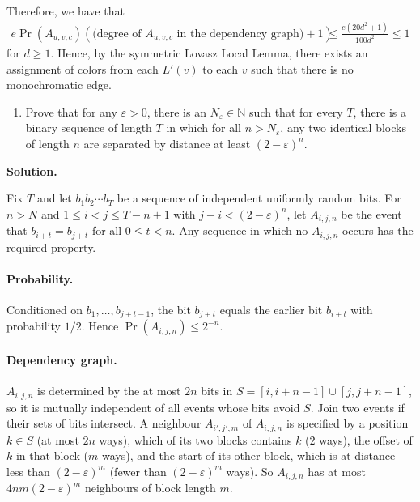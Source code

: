 \documentclass[11pt,letterpaper]{article}
\theoremstyle{definition}
\newcommand{\solution}{\medskip\noindent\textbf{Solution.}\par\medskip}
\begin{document}
Therefore, we have that 
\begin{align*}
    e \Pr(A_{u,v,c}) (\text{(degree of }A_{u,v,c}\text{ in the dependency graph)}+1) &\leq \frac{e (20 d^2+1)}{100 d^2} \leq 1
\end{align*}
for $d\geq 1$. Hence, by the symmetric Lovasz Local Lemma, there exists an assignment of colors from each $L'(v)$ to each $v$ such that there is no monochromatic edge.

\begin{enumerate}[resume=q]
\item Prove that for any $\varepsilon>0$, there is an $N_\varepsilon\in\mathbb{N}$ such that for every $T$, there is a binary sequence of length $T$ in which for all $n>N_\varepsilon$, any two identical blocks of length $n$ are separated by distance at least $(2-\varepsilon)^n$.
\end{enumerate}

\solution

Fix $T$ and let $b_1b_2\cdots b_T$ be a sequence of independent uniformly random bits.
For $n>N$ and $1\leq i<j\leq T-n+1$ with $j-i<(2-\varepsilon)^n$, let $A_{i,j,n}$ be the event that $b_{i+t}=b_{j+t}$ for all $0\leq t<n$.
Any sequence in which no $A_{i,j,n}$ occurs has the required property.

\paragraph{Probability.}
Conditioned on $b_1,\dots,b_{j+t-1}$, the bit $b_{j+t}$ equals the earlier bit $b_{i+t}$ with probability $1/2$.
Hence $\Pr(A_{i,j,n})\leq2^{-n}$.

\paragraph{Dependency graph.}
$A_{i,j,n}$ is determined by the at most $2n$ bits in $S=[i,i+n-1]\cup[j,j+n-1]$, so it is mutually independent of all events whose bits avoid $S$.
Join two events if their sets of bits intersect.
A neighbour $A_{i',j',m}$ of $A_{i,j,n}$ is specified by a position $k\in S$ (at most $2n$ ways), which of its two blocks contains $k$ ($2$ ways), the offset of $k$ in that block ($m$ ways), and the start of its other block, which is at distance less than $(2-\varepsilon)^m$ (fewer than $(2-\varepsilon)^m$ ways).
So $A_{i,j,n}$ has at most $4nm(2-\varepsilon)^m$ neighbours of block length $m$.
\end{document}
